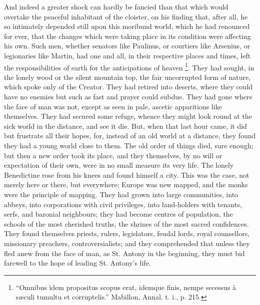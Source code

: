 And indeed a greater shock can hardly be fancied than that which
would overtake the peaceful inhabitant of the cloister, on his finding
that, after all, he so intimately depended still upon this moribund
world, which he had renounced for ever, that the changes which were
taking place in its condition were affecting his own. Such men,
whether senators like Paulinus, or courtiers like Arsenius, or
legionaries like Martin, had one and all, in their respective places
and times, left the responsibilities of earth for the anticipations of
heaven \footnote{``Omnibus
idem propositus scopus erat, idemque finis, nempe secessus à sæculi
tumultu et corruptelis.'' Mabillon, Annal. t. i., p. 215.}. They had sought,
in the lonely wood or the silent mountain top, the fair uncorrupted
form of nature, which spoke only of the Creator. They had
retired into deserts, where they could have no enemies but such as
fast and prayer could subdue. They had gone where the face of man was
not, except as seen in pale, ascetic apparitions like themselves. They
had secured some refuge, whence they might look round at the sick
world in the distance, and see it die. But, when that last hour came,
it did but frustrate all their hopes, for, instead of an old world at
a distance, they found they had a young world close to them. The old
order of things died, sure enough; but then a new order took its
place, and they themselves, by no will or expectation of their own,
were in no small measure its very life. The lonely Benedictine rose
from his knees and found himself a city. This was the case, not merely
here or there, but everywhere; Europe was new mapped, and the monks
were the principle of mapping. They had grown into large communities,
into abbeys, into corporations with civil privileges, into
land-holders with tenants, serfs, and baronial neighbours; they had
become centres of population, the schools of the most cherished
truths, the shrines of the most sacred confidences. They found
themselves priests, rulers, legislators, feudal lords, royal
counsellors, missionary preachers, controversialists; and they
comprehended that unless they fled anew from the face of man, as St.
Antony in the beginning, they must bid farewell to the hope of leading
St. Antony's life.

